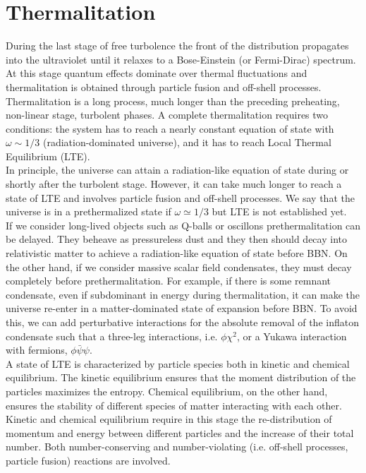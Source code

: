 \documentclass[11pt,a4paper,twoside]{book}
\begin{document}
\section{Thermalitation}
During the last stage of free turbolence the front of the distribution propagates into the ultraviolet until it relaxes to a Bose-Einstein (or Fermi-Dirac) spectrum. At this stage quantum effects dominate over thermal fluctuations and thermalitation is obtained through particle fusion and off-shell processes. \\
Thermalitation is a long process, much longer than the preceding preheating, non-linear stage, turbolent phases. A complete thermalitation requires two conditions: the system has to reach a nearly constant equation of state with $\omega \sim 1/3$ (radiation-dominated universe), and it has to reach Local Thermal Equilibrium (LTE).\\
 In principle, the universe can attain a radiation-like equation of state during or shortly after the turbolent stage. However, it can take much longer  to reach a state of LTE and involves particle fusion and off-shell processes.  We say that the universe is in a prethermalized state if $\omega \simeq 1/3$ but LTE is not established yet.\\
If we consider long-lived objects such as Q-balls or oscillons prethermalitation can be delayed. They beheave as pressureless dust  and they then should decay into relativistic matter to achieve a radiation-like equation of state before BBN. On the other hand, if we consider  massive scalar field condensates, they must decay completely before prethermalitation. For example, if there is some remnant condensate, even if subdominant in energy during thermalitation, it can make the universe re-enter in a matter-dominated  state of expansion before BBN. To avoid this, we can add perturbative interactions for the absolute removal of the inflaton condensate such that a three-leg interactions, i.e. $\phi\chi^{2}$, or a Yukawa interaction with fermions, $\phi \bar{\psi}\psi$. \\ 
A state of LTE is characterized by particle species both in kinetic and chemical equilibrium. The kinetic equilibrium ensures that the moment distribution of the particles maximizes the entropy. Chemical equilibrium, on the other hand,  ensures the stability of different species of matter interacting with each other. Kinetic and chemical equilibrium require in this stage the re-distribution of momentum and energy between different particles and the increase of their total number. Both number-conserving and number-violating (i.e. off-shell processes, particle fusion) reactions are involved.\\
\end{document}
